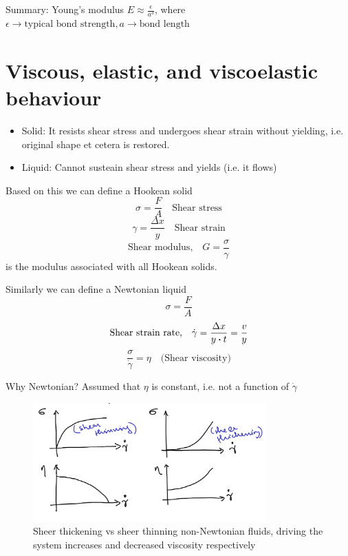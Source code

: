 \documentclass[a4paper]{article}
\begin{document}
Summary: Young's modulus $E \approx \frac{\epsilon}{a^3}$, where
$\epsilon \to  \text{typical bond strength}, a \to  \text{bond length}$ %

\section*{Viscous, elastic, and viscoelastic behaviour}
\begin{itemize}
	\item Solid: It resists shear stress and undergoes shear strain without yielding, i.e. original shape et cetera is restored.
	\item Liquid: Cannot susteain shear stress and yields (i.e. it flows)
\end{itemize}

Based on this we can define a Hookean solid
\begin{equation}
	\sigma = \frac{F}{A} \quad \text{Shear stress} 
\end{equation}
\begin{equation}
	\gamma = \frac{\Delta x}{y} \quad \text{Shear strain}
\end{equation}
\begin{equation}
	\text{Shear modulus,} \quad G = \frac{\sigma}{\gamma}
\end{equation}
is the modulus associated with all Hookean solids.

Similarly we can define a Newtonian liquid
\begin{equation}
	\sigma = \frac{F}{A}
\end{equation}
\begin{equation}
	\text{Shear strain rate,} \quad \dot{\gamma} = \frac{\Delta x}{y\vdot t} = \frac{v}{y}
\end{equation}
\begin{equation}
	\frac{\sigma}{\dot{\gamma}} = \eta \quad \text{(Shear viscosity)}
\end{equation}

Why Newtonian? Assumed that $\eta$ is constant, i.e. not a function of 
$\dot{\gamma}$

\begin{figure}[h]
	\centering
	\includegraphics[width=0.8\textwidth]{figures/nonnewtonian.png}
	\caption{Sheer thickening vs sheer thinning non-Newtonian fluids, driving the system increases and decreased viscosity respectively}
	\label{fig:figures-nonnewtonian-png}
\end{figure}
\end{document}
